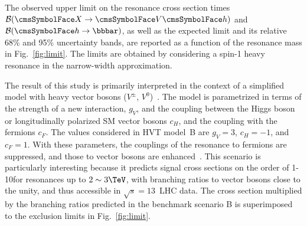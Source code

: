 The observed upper limit on the resonance cross section times $\B(\X\to\VH)$ and $\B(\htobb)$, as well as the expected limit and its relative 68\% and 95\% uncertainty bands, are reported as a function of the resonance mass in Fig.~\ref{fig:limit}. The limits are obtained by considering a spin-1 heavy resonance in the narrow-width approximation. %





The result of this study is primarily interpreted in the context of a simplified model with heavy vector bosons ($V^\pm$, $V^0$)~\cite{Pappadopulo2014}.  The model is parametrized in terms of the strength of a new interaction, $g_V$, and the coupling between the Higgs boson or longitudinally polarized SM vector bosons $c_H$, and the coupling with the fermions $c_F$.
The values considered in HVT model~B are $g_V = 3$, $c_H = -1$, and $c_F = 1$. With these parameters, the couplings of the resonance to fermions are suppressed, and those to vector bosons are enhanced~\cite{Pappadopulo2014}.
This scenario is particularly interesting because it predicts signal cross sections on the order of 1-10\fb for resonances up to $2 \sim 3 \TeV$, with branching ratios to vector bosons close to the unity, and thus accessible in $\sqrt{s}=13$~\TeV LHC data. The cross section multiplied by the branching ratios predicted in the benchmark scenario B is superimposed to the exclusion limits in Fig.~\ref{fig:limit}.




